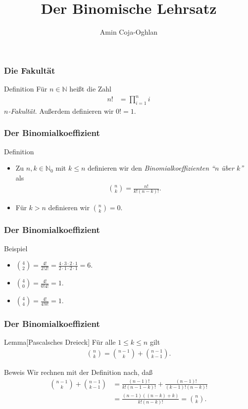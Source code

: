 \documentclass{beamer}
\title[Linadi]{Der Binomische Lehrsatz}
\author[Amin Coja-Oghlan]{Amin Coja-Oghlan}
\institute[Frankfurt]{JWGUFFM}
\date{}
\renewcommand{\emph}[1]{{\textcolor{solarizedRed}{\itshape #1}}}
\newcommand\NN{\mathbb N}
\renewcommand{\ae}{\"a}
\newcommand{\ue}{\"u}
\begin{document}
\frame[plain]{\titlepage}

\begin{frame}\frametitle{Die Fakult\ae t}
\begin{block}{Definition}
	F\ue r $n\in\NN$ hei\ss t die Zahl
	\begin{align*}
		n!&=\prod_{i=1}^ni
	\end{align*}
	\emph{$n$-Fakult\ae t}.
	Au\ss erdem definieren wir $0!=1$.
\end{block}
\end{frame}

\begin{frame}\frametitle{Der Binomialkoeffizient}
\begin{block}{Definition}
\begin{itemize}
\item Zu $n,k\in\NN_0$ mit $k\leq n$ definieren wir den \emph{Binomialkoeffizienten ``$n$ \ue ber $k$''} als
	\begin{align*}
		\binom nk=\frac{n!}{k!(n-k)!}.
	\end{align*}
\item F\ue r $k>n$ definieren wir $\binom nk=0$.
\end{itemize}
\end{block}
\end{frame}

\begin{frame}\frametitle{Der Binomialkoeffizient}
\begin{block}{Beispiel}
\begin{itemize}
	\item $\binom{4}2=\frac{4!}{2!2!}=\frac{4\cdot 3\cdot 2\cdot 1}{2\cdot 1\cdot 2\cdot 1}=6$.
	\item $\binom{4}0=\frac{4!}{0!4!}=1$.
	\item $\binom44=\frac{4!}{4!0!}=1$.
\end{itemize}
\end{block}
\end{frame}

\begin{frame}\frametitle{Der Binomialkoeffizient}
	\begin{block}{Lemma\hfill[Pascalsches Dreieck]}
F\ue r alle $1\leq k\leq n$ gilt
\begin{align*}
	\binom nk=\binom{n-1}k+\binom {n-1}{k-1}.
\end{align*}
\end{block}
\begin{block}{Beweis}
Wir rechnen mit der Definition nach, da\ss
\begin{align*}
	\binom{n-1}k+\binom {n-1}{k-1}&=\frac{(n-1)!}{k!(n-1-k)!}+\frac{(n-1)!}{(k-1)!(n-k)!}\\
								  &=\frac{(n-1)((n-k)+k)}{k!(n-k)!}=\binom nk.
\end{align*}
\end{block}
\end{frame}
\end{document}
